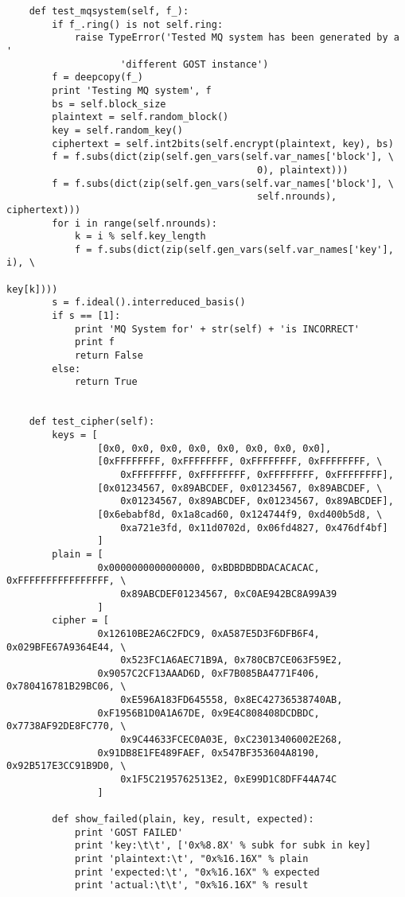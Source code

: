 \begin{lstlisting}
    def test_mqsystem(self, f_):
        if f_.ring() is not self.ring:
            raise TypeError('Tested MQ system has been generated by a '
                    'different GOST instance')
        f = deepcopy(f_)
        print 'Testing MQ system', f
        bs = self.block_size
        plaintext = self.random_block()
        key = self.random_key()
        ciphertext = self.int2bits(self.encrypt(plaintext, key), bs)
        f = f.subs(dict(zip(self.gen_vars(self.var_names['block'], \
                                            0), plaintext)))
        f = f.subs(dict(zip(self.gen_vars(self.var_names['block'], \
                                            self.nrounds), ciphertext)))
        for i in range(self.nrounds):
            k = i % self.key_length
            f = f.subs(dict(zip(self.gen_vars(self.var_names['key'], i), \
                                                                key[k])))
        s = f.ideal().interreduced_basis()
        if s == [1]:
            print 'MQ System for' + str(self) + 'is INCORRECT'
            print f
            return False
        else:
            return True


    def test_cipher(self):
        keys = [
                [0x0, 0x0, 0x0, 0x0, 0x0, 0x0, 0x0, 0x0],
                [0xFFFFFFFF, 0xFFFFFFFF, 0xFFFFFFFF, 0xFFFFFFFF, \
                    0xFFFFFFFF, 0xFFFFFFFF, 0xFFFFFFFF, 0xFFFFFFFF],
                [0x01234567, 0x89ABCDEF, 0x01234567, 0x89ABCDEF, \
                    0x01234567, 0x89ABCDEF, 0x01234567, 0x89ABCDEF],
                [0x6ebabf8d, 0x1a8cad60, 0x124744f9, 0xd400b5d8, \
                    0xa721e3fd, 0x11d0702d, 0x06fd4827, 0x476df4bf]
                ]
        plain = [
                0x0000000000000000, 0xBDBDBDBDACACACAC, 0xFFFFFFFFFFFFFFFF, \
                    0x89ABCDEF01234567, 0xC0AE942BC8A99A39
                ]
        cipher = [
                0x12610BE2A6C2FDC9, 0xA587E5D3F6DFB6F4, 0x029BFE67A9364E44, \
                    0x523FC1A6AEC71B9A, 0x780CB7CE063F59E2,
                0x9057C2CF13AAAD6D, 0xF7B085BA4771F406, 0x780416781B29BC06, \
                    0xE596A183FD645558, 0x8EC42736538740AB,
                0xF1956B1D0A1A67DE, 0x9E4C808408DCDBDC, 0x7738AF92DE8FC770, \
                    0x9C44633FCEC0A03E, 0xC23013406002E268,
                0x91DB8E1FE489FAEF, 0x547BF353604A8190, 0x92B517E3CC91B9D0, \
                    0x1F5C2195762513E2, 0xE99D1C8DFF44A74C
                ]

        def show_failed(plain, key, result, expected):
            print 'GOST FAILED'
            print 'key:\t\t', ['0x%8.8X' % subk for subk in key]
            print 'plaintext:\t', "0x%16.16X" % plain
            print 'expected:\t', "0x%16.16X" % expected
            print 'actual:\t\t', "0x%16.16X" % result


\end{lstlisting}
